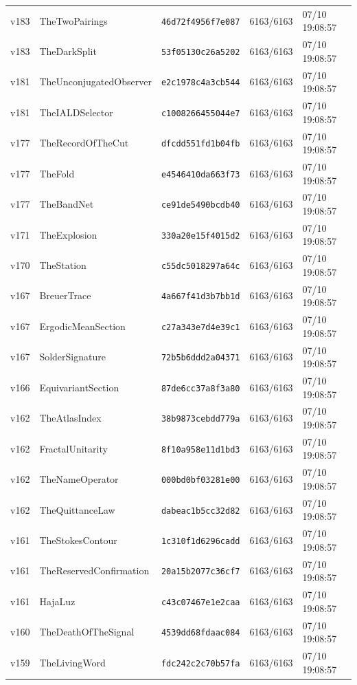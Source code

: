 \documentclass[11pt]{article}
\theoremstyle{definition}\newtheorem{deriv}{Derivação}
\begin{document}
{\begin{longtable}{@{}lllll@{}}
v183 & TheTwoPairings & \texttt{46d72f4956f7e087} & 6163/6163 & 07/10 19:08:57 \\
v183 & TheDarkSplit & \texttt{53f05130c26a5202} & 6163/6163 & 07/10 19:08:57 \\
v181 & TheUnconjugatedObserver & \texttt{e2c1978c4a3cb544} & 6163/6163 & 07/10 19:08:57 \\
v181 & TheIALDSelector & \texttt{c1008266455044e7} & 6163/6163 & 07/10 19:08:57 \\
v177 & TheRecordOfTheCut & \texttt{dfcdd551fd1b04fb} & 6163/6163 & 07/10 19:08:57 \\
v177 & TheFold & \texttt{e4546410da663f73} & 6163/6163 & 07/10 19:08:57 \\
v177 & TheBandNet & \texttt{ce91de5490bcdb40} & 6163/6163 & 07/10 19:08:57 \\
v171 & TheExplosion & \texttt{330a20e15f4015d2} & 6163/6163 & 07/10 19:08:57 \\
v170 & TheStation & \texttt{c55dc5018297a64c} & 6163/6163 & 07/10 19:08:57 \\
v167 & BreuerTrace & \texttt{4a667f41d3b7bb1d} & 6163/6163 & 07/10 19:08:57 \\
v167 & ErgodicMeanSection & \texttt{c27a343e7d4e39c1} & 6163/6163 & 07/10 19:08:57 \\
v167 & SolderSignature & \texttt{72b5b6ddd2a04371} & 6163/6163 & 07/10 19:08:57 \\
v166 & EquivariantSection & \texttt{87de6cc37a8f3a80} & 6163/6163 & 07/10 19:08:57 \\
v162 & TheAtlasIndex & \texttt{38b9873cebdd779a} & 6163/6163 & 07/10 19:08:57 \\
v162 & FractalUnitarity & \texttt{8f10a958e11d1bd3} & 6163/6163 & 07/10 19:08:57 \\
v162 & TheNameOperator & \texttt{000bd0bf03281e00} & 6163/6163 & 07/10 19:08:57 \\
v162 & TheQuittanceLaw & \texttt{dabeac1b5cc32d82} & 6163/6163 & 07/10 19:08:57 \\
v161 & TheStokesContour & \texttt{1c310f1d6296cadd} & 6163/6163 & 07/10 19:08:57 \\
v161 & TheReservedConfirmation & \texttt{20a15b2077c36cf7} & 6163/6163 & 07/10 19:08:57 \\
v161 & HajaLuz & \texttt{c43c07467e1e2caa} & 6163/6163 & 07/10 19:08:57 \\
v160 & TheDeathOfTheSignal & \texttt{4539dd68fdaac084} & 6163/6163 & 07/10 19:08:57 \\
v159 & TheLivingWord & \texttt{fdc242c2c70b57fa} & 6163/6163 & 07/10 19:08:57 \\

\end{longtable}}
\end{document}
